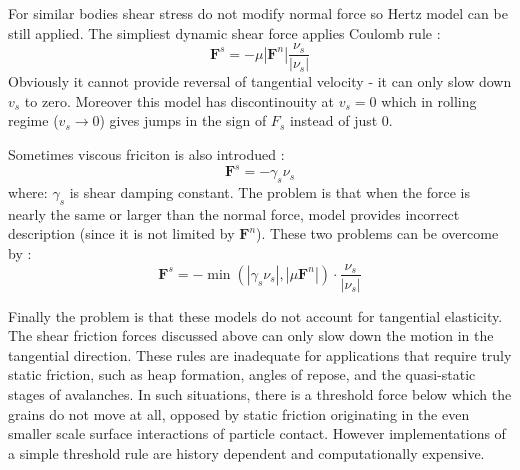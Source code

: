 \documentclass[10pt,a4paper]{article}
\begin{document}
For similar bodies shear stress do not modify normal force so Hertz model can be still applied. 
The simpliest dynamic shear force applies Coulomb rule \cite{haff86}:
\begin{equation}
 \mathbf{F}^s = -\mu |\mathbf{F}^n| \frac{\nu_s}{|\nu_s|}
\end{equation}
Obviously it cannot provide reversal of tangential velocity - it can only slow down $v_s$ to zero.
Moreover this model has discontinouity at $v_s = 0$ which in rolling regime ($v_s \rightarrow 0$) gives jumps in the sign of 
$F_s$ instead of just 0.

Sometimes viscous friciton is also introdued \cite{sok92b}:
\begin{equation}
 \mathbf{F}^s = -\gamma_s \nu_s
\end{equation}
where: $\gamma_s$ is shear damping constant. %
The problem is that when the force is nearly the same or larger than the normal force,
model provides incorrect description (since it is not limited by $\mathbf{F}^n$).
These two problems can be overcome by \cite{pb93, pb94, pb95}:
\begin{equation}
 \mathbf{F}^s = -\min(|\gamma_s \nu_s|,|\mu \mathbf{F}^n|) \cdot \frac{\nu_s}{|\nu_s|}
\end{equation}

Finally the problem is that these models do not account for tangential elasticity. 
The shear friction forces discussed above can only slow down the motion in the tangential direction.
These rules are inadequate for applications that require truly static friction, such as heap formation, angles of repose, and
the quasi-static stages of avalanches.  In such situations, there is a threshold force below which the grains do not move at  all, 
opposed by static friction originating in the even smaller scale surface interactions of particle contact. 
However implementations of a simple threshold rule are history dependent and computationally expensive. 
\end{document}
